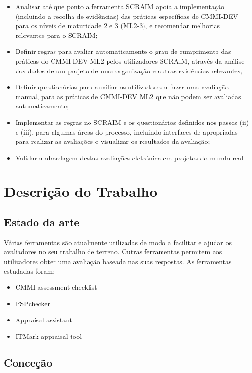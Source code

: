 \documentclass[9pt,a4paper]{extarticle}
\begin{document}
\begin{multicols}{2}
\begin{itemize}
	\item Analisar até que ponto a ferramenta SCRAIM apoia a implementação (incluindo a recolha de evidências) das práticas específicas do CMMI-DEV \cite{Development2010}  para os níveis de maturidade 2 e 3 (ML2-3), e recomendar melhorias relevantes para o SCRAIM;
	\item Definir regras para avaliar automaticamente o grau de cumprimento das práticas do CMMI-DEV ML2 pelos utilizadores SCRAIM, através da análise dos dados de um projeto de uma organização e outras evidências relevantes;
	\item Definir questionários para auxiliar os utilizadores a fazer uma avaliação manual, para as práticas de CMMI-DEV ML2 que não podem ser avaliadas automaticamente;
	\item Implementar as regras no SCRAIM e os questionários definidos nos passos (ii) e (iii), para algumas áreas do processo, incluindo interfaces de apropriadas para realizar as avaliações e visualizar os resultados da avaliação;
	\item Validar a abordagem destas avaliações eletrónica em projetos do mundo real.
\end{itemize}

\section{Descrição do Trabalho}\label{sec:work}

\subsection{Estado da arte}
Várias ferramentas são atualmente utilizadas de modo a facilitar e ajudar os avaliadores no seu trabalho de terreno. Outras ferramentas permitem aos utilizadores obter uma avaliação baseada nas suas respostas.
As ferramentas estudadas foram:
\begin{itemize}
	\item CMMI assessment checklist \cite{capabilityassess}
	\item PSPchecker \cite{Pinto2010}
	\item Appraisal assistant \cite{Appraisal2015}
	\item ITMark appraisal tool ~\cite{ITMARKASSESSMENT}
\end{itemize}

\subsection{Conceção}


\end{multicols}
\end{document}
